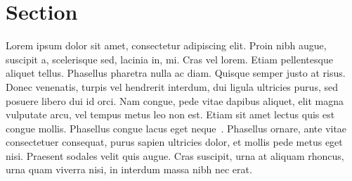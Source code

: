 \section{Section}
Lorem ipsum dolor sit amet, consectetur adipiscing elit. 
Proin nibh augue, suscipit a, scelerisque sed, lacinia in, mi. 
Cras vel lorem. Etiam pellentesque aliquet tellus. Phasellus pharetra 
nulla ac diam. Quisque semper justo at risus. 
Donec venenatis, turpis vel hendrerit interdum, dui ligula ultricies purus, 
sed posuere libero dui id orci. Nam congue, pede vitae dapibus aliquet, 
elit magna vulputate arcu, vel tempus metus leo non est. 
Etiam sit amet lectus quis est congue mollis. 
Phasellus congue lacus eget neque~\cite{example}.
Phasellus ornare, ante vitae consectetuer consequat, purus sapien 
ultricies dolor, et mollis pede metus eget nisi. 
Praesent sodales velit quis augue. Cras suscipit, urna at aliquam rhoncus, 
urna quam viverra nisi, in interdum massa nibh nec erat.


